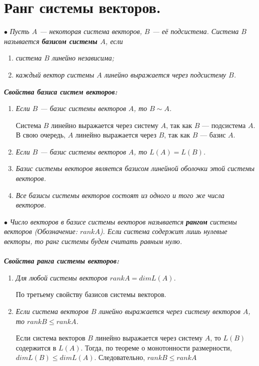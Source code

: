 \section{Ранг системы векторов.}
$\bullet$ \textit{ Пусть $A$ --- некоторая система векторов, $B$ --- её подсистема. Система $B$ называется \textbf{базисом системы $A$}, если}\begin{enumerate}
	\item \textit{система $B$ линейно независима;}
	\item \textit{каждый вектор системы $A$ линейно выражается через подсистему $B$.}
\end{enumerate}
\textit{\textbf{Свойства базиса систем векторов:}}\begin{enumerate}
	\item \textit{Если $B$ --- базис системы векторов $A$, то $B\sim A$.}\begin{Proof}
		Система $B$ линейно выражается через систему $A$, так как $B$ --- подсистема $A$. В свою очередь, $A$ линейно выражается через $B$, так как $B$ --- базис $A$.
	\end{Proof}
	\item \textit{Если $B$  --- базис системы векторов $A$, то $L(A) = L(B)$.}
	\item \textit{Базис системы векторов является базисом линейной оболочки этой системы векторов.}
	\item \textit{Все базисы системы векторов состоят из одного и того же числа векторов.}
\end{enumerate}
$\bullet$ \textit{Число векторов в базисе системы векторов называется \textbf{рангом} системы векторов (Обозначение: $rankA$). Если система содержит лишь нулевые векторы, то ранг системы будем считать равным нулю.}\\\\
\textbf{\textit{Свойства ранга системы векторов:}}\begin{enumerate}
	\item \textit{Для любой системы векторов $rankA = dim L(A)$.}
	\begin{Proof}
		По третьему свойству базисов системы векторов.
	\end{Proof}
	\item \textit{Если система векторов $B$ линейно выражается через систему векторов $A$, то $rankB\leqslant rankA$.}\begin{Proof}
		Если система векторов $B$ линейно выражается через систему $A$, то $L(B)$ содержится в $L(A)$. Тогда, по теореме о монотонности размерности, $dimL(B)\leqslant dimL(A)$. Следовательно, $rankB\leqslant rankA$
	\end{Proof}
\end{enumerate}
